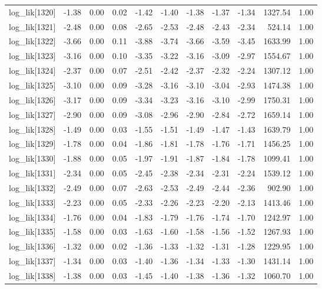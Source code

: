 \begin{table}[ht]
\begin{tabular}{rrrrrrrrrrr}
  log\_lik[1320] & -1.38 & 0.00 & 0.02 & -1.42 & -1.40 & -1.38 & -1.37 & -1.34 & 1327.54 & 1.00 \\ 
  log\_lik[1321] & -2.48 & 0.00 & 0.08 & -2.65 & -2.53 & -2.48 & -2.43 & -2.34 & 524.14 & 1.00 \\ 
  log\_lik[1322] & -3.66 & 0.00 & 0.11 & -3.88 & -3.74 & -3.66 & -3.59 & -3.45 & 1633.99 & 1.00 \\ 
  log\_lik[1323] & -3.16 & 0.00 & 0.10 & -3.35 & -3.22 & -3.16 & -3.09 & -2.97 & 1554.67 & 1.00 \\ 
  log\_lik[1324] & -2.37 & 0.00 & 0.07 & -2.51 & -2.42 & -2.37 & -2.32 & -2.24 & 1307.12 & 1.00 \\ 
  log\_lik[1325] & -3.10 & 0.00 & 0.09 & -3.28 & -3.16 & -3.10 & -3.04 & -2.93 & 1474.38 & 1.00 \\ 
  log\_lik[1326] & -3.17 & 0.00 & 0.09 & -3.34 & -3.23 & -3.16 & -3.10 & -2.99 & 1750.31 & 1.00 \\ 
  log\_lik[1327] & -2.90 & 0.00 & 0.09 & -3.08 & -2.96 & -2.90 & -2.84 & -2.72 & 1659.14 & 1.00 \\ 
  log\_lik[1328] & -1.49 & 0.00 & 0.03 & -1.55 & -1.51 & -1.49 & -1.47 & -1.43 & 1639.79 & 1.00 \\ 
  log\_lik[1329] & -1.78 & 0.00 & 0.04 & -1.86 & -1.81 & -1.78 & -1.76 & -1.71 & 1456.25 & 1.00 \\ 
  log\_lik[1330] & -1.88 & 0.00 & 0.05 & -1.97 & -1.91 & -1.87 & -1.84 & -1.78 & 1099.41 & 1.00 \\ 
  log\_lik[1331] & -2.34 & 0.00 & 0.05 & -2.45 & -2.38 & -2.34 & -2.31 & -2.24 & 1539.12 & 1.00 \\ 
  log\_lik[1332] & -2.49 & 0.00 & 0.07 & -2.63 & -2.53 & -2.49 & -2.44 & -2.36 & 902.90 & 1.00 \\ 
  log\_lik[1333] & -2.23 & 0.00 & 0.05 & -2.33 & -2.26 & -2.23 & -2.20 & -2.13 & 1413.46 & 1.00 \\ 
  log\_lik[1334] & -1.76 & 0.00 & 0.04 & -1.83 & -1.79 & -1.76 & -1.74 & -1.70 & 1242.97 & 1.00 \\ 
  log\_lik[1335] & -1.58 & 0.00 & 0.03 & -1.63 & -1.60 & -1.58 & -1.56 & -1.52 & 1267.93 & 1.00 \\ 
  log\_lik[1336] & -1.32 & 0.00 & 0.02 & -1.36 & -1.33 & -1.32 & -1.31 & -1.28 & 1229.95 & 1.00 \\ 
  log\_lik[1337] & -1.34 & 0.00 & 0.03 & -1.40 & -1.36 & -1.34 & -1.33 & -1.30 & 1431.14 & 1.00 \\ 
  log\_lik[1338] & -1.38 & 0.00 & 0.03 & -1.45 & -1.40 & -1.38 & -1.36 & -1.32 & 1060.70 & 1.00 \\ 

\end{tabular}
\end{table}
